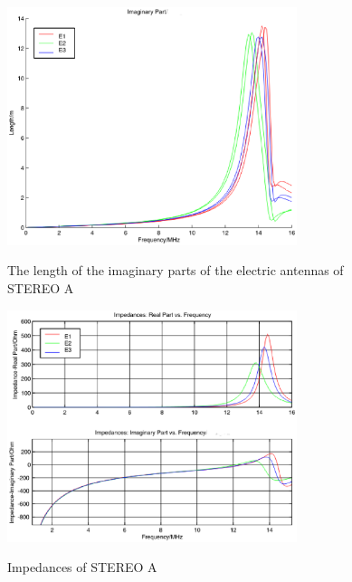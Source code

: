 \documentclass[galley,ras]{agu2001}
\begin{document}
\begin{article}
\begin{figure}
\noindent \includegraphics[width=20pc]{HeffLengthImagD2_caps.eps} \\
\caption{The length of the imaginary parts of the electric antennas of STEREO A} \label{fig_Heff_length_imag_caps_D2}
\end{figure}


 \begin{figure}
 \noindent \includegraphics[width=20pc]{ImpedancesD21_caps.eps}\\ \caption{Impedances of STEREO A} \label{fig_Impedance1_D2_caps}
\end{figure}


\end{article}
\end{document}
